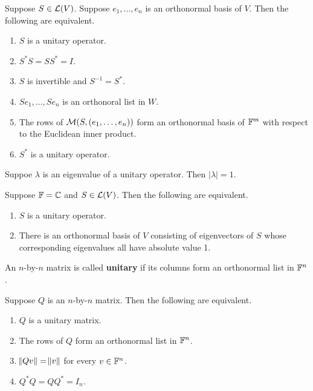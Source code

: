 \documentclass{extarticle}
\begin{document}
\begin{thm}
    Suppose \(S \in \mathcal{L}(V)\). Suppose \(e_1, \ldots, e_n\) is an orthonormal basis of \(V\). 
    Then the following are equivalent. 
    \begin{enumerate}[label=(\alph*)]
        \item \(S\) is a unitary operator.  
        \item \(S^* S = SS^* =  I\). 
        \item \(S\) is invertible and \(S^{-1} =S^*\).  
        \item \(Se_1, \ldots, Se_n\) is an orthonoral list in \(W\). 
        \item The rows of \(\mathcal{M}(S, (e_1, \ldots, e_n))\) form an orthonormal 
        basis of \(\mathbb{F}^m\) with respect to the Euclidean inner product. 
        \item \(S^*\) is a unitary operator. 
    \end{enumerate}
\end{thm}

\begin{corollary}
    Suppoe \(\lambda\) is an eigenvalue of a unitary operator. Then 
    \(|\lambda| = 1\).
\end{corollary}

\begin{corollary}
    Suppose \(\mathbb{F} = \mathbb{C}\) and \(S \in \mathcal{L}(V)\). Then the following are equivalent. 
    \begin{enumerate}[label=(\alph*)]
        \item \(S\) is a unitary operator. 
        \item There is an orthonormal basis of \(V\) consisting of eigenvectors of \(S\) whose 
        corresponding eigenvalues all have absolute value 1. 
    \end{enumerate}
\end{corollary}

\begin{definition}
    An \(n\)-by-\(n\) matrix is called \textbf{unitary} if its columns form an orthonormal list in \(\mathbb{F}^n\).
\end{definition}

\begin{thm}
    Suppose \(Q\) is an \(n\)-by-\(n\) matrix. Then the following are equivalent. 
    \begin{enumerate}[label=(\alph*)]
        \item \(Q\) is a unitary matrix. 
        \item The rows of \(Q\) form an orthonormal list in \(\mathbb{F}^n\). 
        \item \(\norm{Qv} = \norm{v}\) for every \(v \in \mathbb{F}^n\). 
        \item \(Q^* Q = Q Q^* = I_n\).
    \end{enumerate}
\end{thm}
\end{document}
